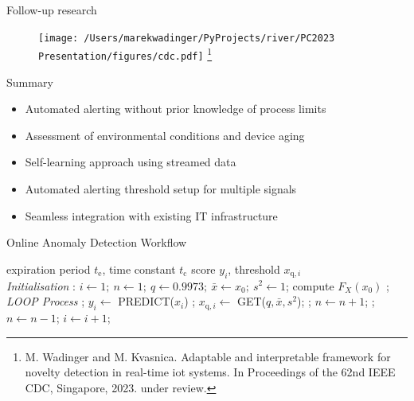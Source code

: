 \documentclass{beamer}
\newcommand{\ui}[2]{#1 _{\mathrm{#2}}}
\newcommand{\uis}[3]{#1 _{\mathrm{#2}, #3}}
\begin{document}
\begin{frame}{Follow-up research}
    \begin{figure}[htpb]
        \begin{center}
            \texttt{[image: /Users/marekwadinger/PyProjects/river/PC2023 Presentation/figures/cdc.pdf]}
            \footnote{\tiny M. Wadinger and M. Kvasnica. Adaptable and interpretable framework for novelty detection in real-time iot systems. In Proceedings of the 62nd IEEE CDC, Singapore, 2023. under review.}
        \end{center}
    \end{figure}
\end{frame}

\begin{frame}{Summary}
    \begin{itemize}
        \item Automated alerting without prior knowledge of process limits
        \item Assessment of environmental conditions and device aging
        \item Self-learning approach using streamed data
        \item Automated alerting threshold setup for multiple signals
        \item Seamless integration with existing IT infrastructure
    \end{itemize}
\end{frame}

\begin{frame}{Online Anomaly Detection Workflow}
    \begin{algorithmic}[1]
        \scriptsize
        \renewcommand{\algorithmicrequire}{\textbf{Input:}}
        \renewcommand{\algorithmicensure}{\textbf{Output:}}
        \REQUIRE expiration period $\ui{t}{e}$, time constant $\ui{t}{c}$
        \ENSURE  score $y_i$, threshold $\uis{x}{q}{i}$
        \\ \textit{Initialisation} :
        \STATE $i \leftarrow 1;~ n \leftarrow 1;~ q \leftarrow 0.9973;~ \bar x  \leftarrow x_0;~  s^2 \leftarrow 1$;
        \STATE compute $F_X(x_0)$ ;
        \\ \textit{LOOP Process}
        \LOOP
        ;
        \STATE $y_i \leftarrow$ PREDICT($x_i$) ;
        \STATE $\uis{x}{q}{i} \leftarrow$ GET($q, \bar x, s^2$);
        \IF {\eqref{case:normal} \OR \eqref{eq:update}}
        ;
        \STATE $n \leftarrow n + 1$;
        \FOR {$x_{i-\ui{t}{e}}$}
        \STATE {$\bar x$, $s^2 \leftarrow$ REVERT($x_{i-\ui{t}{e}}, \bar x, s^2, n$)};
        \STATE $n \leftarrow n - 1$;
        \ENDFOR
        \ENDIF
        \STATE $i \leftarrow i + 1$;
        \ENDLOOP
    \end{algorithmic}
\end{frame}
\end{document}
